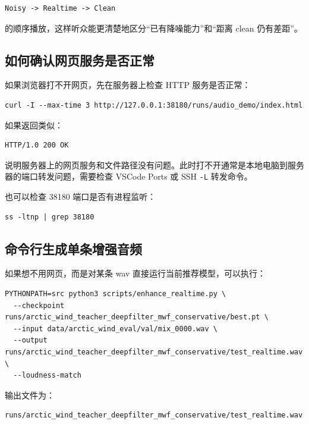 \documentclass[UTF8,12pt,a4paper]{ctexart}
\begin{document}
\begin{lstlisting}
Noisy -> Realtime -> Clean
\end{lstlisting}

的顺序播放，这样听众能更清楚地区分“已有降噪能力”和“距离 clean 仍有差距”。

\subsection{如何确认网页服务是否正常}

如果浏览器打不开网页，先在服务器上检查 HTTP 服务是否正常：

\begin{lstlisting}
curl -I --max-time 3 http://127.0.0.1:38180/runs/audio_demo/index.html
\end{lstlisting}

如果返回类似：

\begin{lstlisting}
HTTP/1.0 200 OK
\end{lstlisting}

说明服务器上的网页服务和文件路径没有问题。此时打不开通常是本地电脑到服务器的端口转发问题，需要检查 VSCode Ports 或 SSH \texttt{-L} 转发命令。

也可以检查 38180 端口是否有进程监听：

\begin{lstlisting}
ss -ltnp | grep 38180
\end{lstlisting}

\subsection{命令行生成单条增强音频}

如果想不用网页，而是对某条 wav 直接运行当前推荐模型，可以执行：

\begin{lstlisting}
PYTHONPATH=src python3 scripts/enhance_realtime.py \
  --checkpoint runs/arctic_wind_teacher_deepfilter_mwf_conservative/best.pt \
  --input data/arctic_wind_eval/val/mix_0000.wav \
  --output runs/arctic_wind_teacher_deepfilter_mwf_conservative/test_realtime.wav \
  --loudness-match
\end{lstlisting}

输出文件为：

\begin{lstlisting}
runs/arctic_wind_teacher_deepfilter_mwf_conservative/test_realtime.wav
\end{lstlisting}
\end{document}

